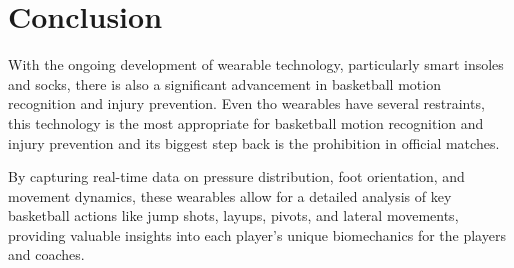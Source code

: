


%

\chapter{Conclusion}
\label{cha:conclusion}


With the ongoing development of wearable technology, particularly smart insoles and socks, there is also a significant advancement in basketball motion recognition and 
injury prevention. Even tho wearables have several restraints, this technology is the most appropriate for basketball motion recognition and injury prevention and its biggest step 
back is the prohibition in official matches.

By capturing real-time data on pressure distribution, foot orientation, and movement dynamics, these wearables allow for a 
detailed analysis of key basketball actions like jump shots, layups, pivots, and lateral movements, providing valuable insights into each player's unique biomechanics for the players 
and coaches. 
